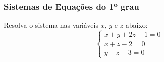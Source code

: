            
            

\begin{frame}
    \frametitle{Sistemas de Equações do 1º grau} 
        
    
    \begin{exemplo}
        Resolva o sistema nas variáveis $x$, $y$ e $z$ abaixo:
        $$\left\{
        \begin{array}{lll}
        x+y+2z-1 = 0 \\
        x+z-2 = 0 \\
        y+z-3 = 0
        \end{array} \right.$$
    \end{exemplo}
        
        
\end{frame}
            
            
            

